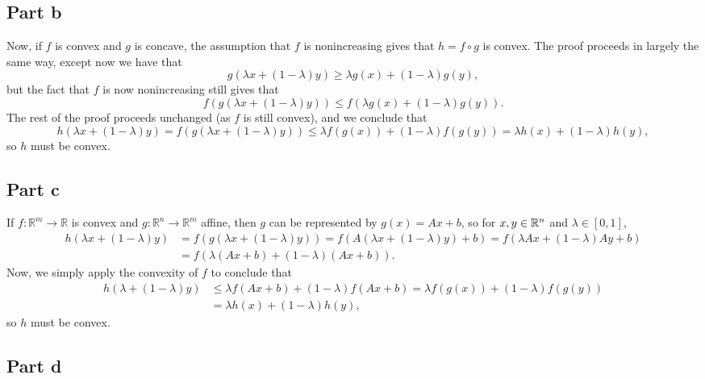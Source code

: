 \documentclass{article}
\begin{document}
\subsection{Part b}
Now, if $f$ is convex and $g$ is concave, the assumption that $f$ is nonincreasing gives that $h=f\circ g$ is convex. The proof proceeds in largely the same way, except now we have that
\[
g(\lambda x+(1-\lambda)y)\geq\lambda g(x)+(1-\lambda)g(y),
\]
but the fact that $f$ is now nonincreasing still gives that 
\[
f(g(\lambda x+(1-\lambda)y))\leq f(\lambda g(x)+(1-\lambda)g(y)).
\]
The rest of the proof proceeds unchanged (as $f$ is still convex), and we conclude that 
\[
h(\lambda x+(1-\lambda)y)=f(g(\lambda x+(1-\lambda)y))\leq \lambda f(g(x))+(1-\lambda)f(g(y))=\lambda h(x)+(1-\lambda)h(y),
\]
so $h$ must be convex.

\subsection{Part c}
If $f: \mathbb{R}^m \rightarrow \mathbb{R}$ is convex and $g: \mathbb{R}^n \rightarrow \mathbb{R}^m$ affine, then $g$ can be represented by $g(x)=Ax+b$, so for $x,y\in\mathbb{R}^n$ and $\lambda\in[0,1]$, 
\begin{align*}
h(\lambda x+(1-\lambda)y)&=f(g(\lambda x+(1-\lambda)y))=f(A(\lambda x+(1-\lambda)y)+b)=f(\lambda Ax+(1-\lambda)Ay+b)\\&=
f(\lambda(Ax+b)+(1-\lambda)(Ax+b)).
\end{align*}
Now, we simply apply the convexity of $f$ to conclude that
\begin{align*}
h(\lambda+(1-\lambda)y)&\leq\lambda f(Ax+b)+(1-\lambda)f(Ax+b)=\lambda f(g(x))+(1-\lambda)f(g(y))\\&=\lambda h(x)+(1-\lambda)h(y),
\end{align*}
so $h$ must be convex.

\subsection{Part d}
\end{document}
